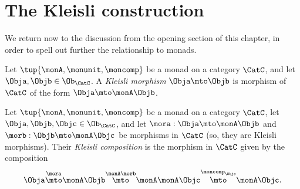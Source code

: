 

\section{The Kleisli construction}
\label{sec:Kleisli}

We return now to the discussion from the opening section of this chapter, in order to spell out further the relationship to monads. 


\begin{ctdefinition}
Let $\tup{\monA, \monunit, \moncomp}$ be a monad on a category $\CatC$, and let $\Obja, \Objb \in \Ob_\CatC$. A 
\emph{Kleisli morphism} $\Obja \mto \Objb$ is morphism of $\CatC$ of the form $\Obja \mto \monA \Objb$. 
\end{ctdefinition}


\begin{ctdefinition}
Let $\tup{\monA, \monunit, \moncomp}$ be a monad on a category $\CatC$, let $\Obja, \Objb, \Objc \in \Ob_\CatC$,  and let $\mora : \Obja \mto \monA \Objb$ and $\morb : \Objb \mto \monA \Objc$ be morphisms in $\CatC$ (so, they are Kleisli morphisms). Their \emph{Kleisli composition} is the morphism in $\CatC$ given by the composition
\begin{equation}
\Obja \overset{\mora}{\mto} \monA \Objb \overset{\monA \morb}{\mto} \monA \monA \Objc \overset{\moncomp_\Objc}{\mto} \monA \Objc.
\end{equation}
\end{ctdefinition}


